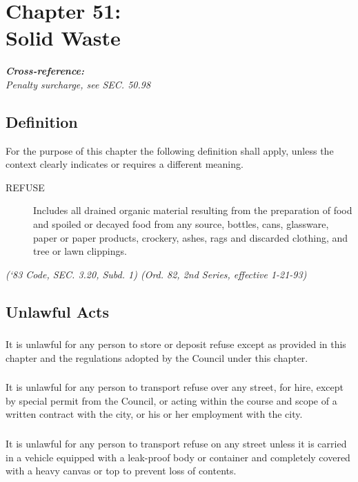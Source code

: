 \chapter*{Chapter 51: \\
	Solid Waste}
    \minitoc
    \textbf{\emph{{Cross-reference:}}}\\
    \emph{Penalty surcharge, see SEC. 50.98}
    \pagebreak

\section{Definition}
For the purpose of this chapter the following definition shall apply, unless the context clearly indicates or requires a different meaning.
\begin{description}
    \item[REFUSE] Includes all drained organic material resulting from the preparation of food and spoiled or decayed food from any source, bottles, cans, glassware, paper or paper products, crockery, ashes, rags and discarded clothing, and tree or lawn clippings.
\end{description}
\emph{(‘83 Code, SEC. 3.20, Subd. 1) (Ord. 82, 2nd Series, effective 1-21-93)}
\section{Unlawful Acts}
\subsection{}
It is unlawful for any person to store or deposit refuse except as provided in this chapter and the regulations adopted by the Council under this chapter.
\subsection{}
It is unlawful for any person to transport refuse over any street, for hire, except by special permit from the Council, or acting within the course and scope of a written contract with the city, or his or her employment with the city.
\subsection{}
It is unlawful for any person to transport refuse on any street unless it is carried in a vehicle equipped with a leak-proof body or container and completely covered with a heavy canvas or top to prevent loss of contents.
